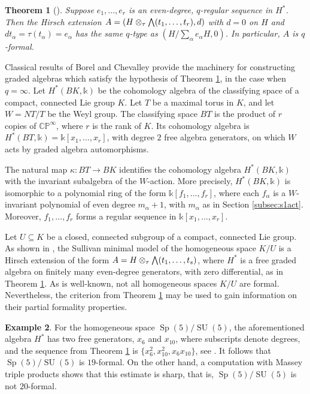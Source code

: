 \documentclass{article}
\numberwithin{equation}{section}
\newtheorem{theorem}{Theorem}[section]
\theoremstyle{definition}
\newtheorem{example}[theorem]{Example}
\newcommand{\CP}{\mathbb{CP}}
\renewcommand{\k}{\mathbb{k}}
\DeclareMathOperator{\Sp}{Sp}
\DeclareMathOperator{\SU}{SU}
\newcommand{\bwedge}{\mbox{\normalsize $\bigwedge$}}
\begin{document}
\begin{theorem}[\cite{PS-imrn19}]
\label{thm:lefred}
Suppose $e_1,\dots ,e_r$ is an even-degree, $q$-regular sequence in $H^{*}$.  
Then the Hirsch extension $A=(H \otimes_{\tau} \bwedge (t_1,\dots ,t_r),d)$ with 
$d=0$ on $H$  and $dt_{\alpha}=\tau (t_{\alpha})=e_{\alpha}$ has 
the same $q$-type as $(H/\sum_{\alpha} e_{\alpha} H, 0)$.
In particular, $A$ is $q$-formal.
\end{theorem}

Classical results of Borel and Chevalley provide the machinery for 
constructing graded algebras which satisfy the hypothesis 
of Theorem \ref{thm:lefred}, in the case when $q=\infty$.
Let $H^{*}(BK,\k)$ be the cohomology algebra of the classifying 
space of a compact, connected Lie group $K$.  Let $T$ be a maximal 
torus in $K$, and let $W=NT/T$ be the Weyl group. The classifying 
space $BT$ is the product of $r$ copies of $\CP^{\infty}$, where $r$ 
is the rank of $K$. Its cohomology algebra is $H^{*}(BT,\k)=\k [x_1,\dots, x_r]$,
with degree $2$ free algebra generators, on which $W$ acts by graded 
algebra automorphisms. 

The natural map $\kappa \colon BT \to BK$ identifies the cohomology 
algebra $H^{*}(BK,\k)$ with the invariant subalgebra
of the $W$-action. More precisely, $H^{*}(BK,\k)$ is isomorphic 
to a polynomial ring of the form $\k [f_1,\dots, f_r]$, 
where each $f_{\alpha}$ is a $W$-invariant polynomial of 
even degree $m_{\alpha}+1$, with $m_{\alpha}$ 
as in Section \ref{subsec:s1act}. Moreover, $f_1,\dots , f_r$  
forms a regular sequence in $\k [x_1,\dots, x_r]$. 


Let $U\subseteq K$ be a closed, connected subgroup of a compact, 
connected Lie group. As shown in \cite{Th}, the Sullivan minimal model 
of the homogeneous space $K/U$ is a Hirsch extension of the form 
$A=H \otimes_{\tau} \bwedge (t_1,\dots ,t_s)$, where $H^{*}$ 
is a free graded algebra on finitely many even-degree generators, 
with zero differential, as in Theorem \ref{thm:lefred}.  
As is well-known, not all homogeneous spaces $K/U$ are formal. 
Nevertheless, the criterion from Theorem \ref{thm:lefred} 
may be used to gain  information on their partial 
formality properties.

\begin{example}
\label{ex=homnonf}
For the homogeneous space $\Sp(5)/\SU(5)$, 
the aforementioned algebra $H^{*}$ has two free generators,
$x_6$ and $x_{10}$, where subscripts denote degrees, and the sequence 
from Theorem \ref{thm:lefred} is $\{x^2_6, x^2_{10}, x_6 x_{10}\}$, 
see \cite{FOT}. %
It follows  that $\Sp(5)/\SU(5)$ is $19$-formal. 
On the other hand, a computation with Massey triple 
products shows that this estimate is sharp, that is, 
$\Sp(5)/\SU(5)$ is not $20$-formal. 
\end{example}
\end{document}
